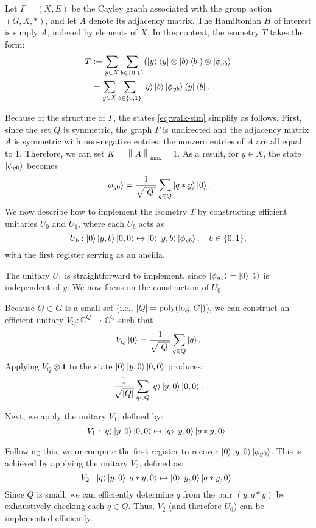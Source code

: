 \documentclass[12pt]{report}
\newcommand{\opnorm}[1]{\left\lVert #1 \right\rVert}
\begin{document}
Let \( \Gamma = (X, E) \) be the Cayley graph associated with the group action \( (G, X, *) \), and let \( A \) denote its adjacency matrix. The Hamiltonian \( H \) of interest is simply \( A \), indexed by elements of \( X \). In this context, the isometry \( T \) takes the form:
\begin{align*}
T
& := \sum_{y \in X} \sum_{b \in \{0, 1\}} (\ket{y}\bra{y} \otimes \ket{b}\bra{b}) \otimes \ket{\phi_{yb}} \\
& = \sum_{y \in X} \sum_{b \in \{0, 1\}} \ket{y} \ket{b} \ket{\phi_{yb}} \bra{y} \bra{b}.
\end{align*}


Because of the structure of $\Gamma$, the states \eqref{eq:walk-sim} simplify as follows. First, since the set $Q$ is symmetric, the graph $\Gamma$ is undirected and the adjacency matrix $A$ is symmetric with non-negative entries; the nonzero entries of $A$ are all equal to $1$. Therefore, we can set $K = \opnorm{A}_{\mathrm{max}} = 1$. As a result, for $y \in X$, the state $\ket{\phi_{y0}}$ becomes
\[ \ket{\phi_{y0}} = \frac{1}{\sqrt{\abs{Q}}} \sum_{q \in Q} \ket{q * y} \ket{0}. \]
We now describe how to implement the isometry \( T \) by constructing efficient unitaries \( U_0 \) and \( U_1 \), where each \( U_b \) acts as
\[
U_b : \ket{0} \ket{y, b} \ket{0, 0} \mapsto \ket{0} \ket{y, b} \ket{\phi_{yb}}, \quad b \in \{0, 1\},
\]
with the first register serving as an ancilla.

The unitary \( U_1 \) is straightforward to implement, since \( \ket{\phi_{y1}} = \ket{0} \ket{1} \) is independent of \( y \). We now focus on the construction of \( U_0 \).

Because \( Q \subset G \) is a small set (i.e., \( \abs{Q} = \operatorname{poly}(\log \abs{G}) \)), we can construct an efficient unitary \( V_Q : \mathbb{C}^Q \to \mathbb{C}^Q \) such that
\[
V_Q \ket{0} = \frac{1}{\sqrt{\abs{Q}}} \sum_{q \in Q} \ket{q}.
\]
Applying \( V_Q \otimes \mathbf{1} \) to the state \( \ket{0} \ket{y, 0} \ket{0, 0} \) produces:
\[
\frac{1}{\sqrt{\abs{Q}}} \sum_{q \in Q} \ket{q} \ket{y, 0} \ket{0, 0}.
\]

Next, we apply the unitary \( V_1 \), defined by:
\[
V_1 : \ket{q} \ket{y, 0} \ket{0, 0} \mapsto \ket{q} \ket{y, 0} \ket{q * y, 0}.
\]

Following this, we uncompute the first register to recover \( \ket{0} \ket{y, 0} \ket{\phi_{y0}} \). This is achieved by applying the unitary \( V_2 \), defined as:
\[
V_2 : \ket{q} \ket{y, 0} \ket{q * y, 0} \mapsto \ket{0} \ket{y, 0} \ket{q * y, 0}.
\]
Since \( Q \) is small, we can efficiently determine \( q \) from the pair \( (y, q * y) \) by exhaustively checking each \( q \in Q \). Thus, \( V_2 \) (and therefore \( U_0 \)) can be implemented efficiently.
\end{document}
